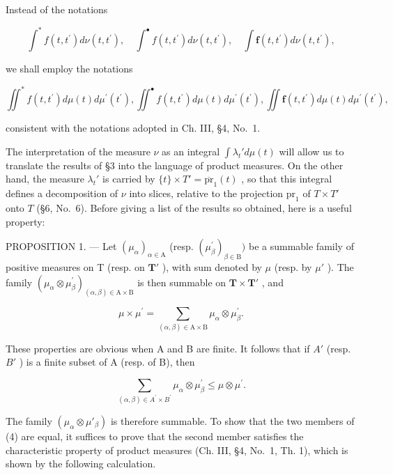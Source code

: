 Instead of the notations

\[
\int^ {*} f (t, t ^ {\prime}) d \nu (t, t ^ {\prime}), \quad \int^ {\bullet} f (t, t ^ {\prime}) d \nu (t, t ^ {\prime}), \quad \int \mathbf {f} (t, t ^ {\prime}) d \nu (t, t ^ {\prime}),
\]

we shall employ the notations

\[
\iint^ {*} f (t, t ^ {\prime}) d \mu (t) d \mu^ {\prime} (t ^ {\prime}), \iint^ {\bullet} f (t, t ^ {\prime}) d \mu (t) d \mu^ {\prime} (t ^ {\prime}), \iint \mathbf {f} (t, t ^ {\prime}) d \mu (t) d \mu^ {\prime} (t ^ {\prime}),
\]

consistent with the notations adopted in Ch. III, §4, No.~1.

The interpretation of the measure \(\nu\) as an integral \(\int \lambda_t' d\mu(t)\) will allow us to translate the results of §3 into the language of product measures. On the other hand, the measure \(\lambda_t'\) is carried by \(\{t\} \times T' = \overline{\text{pr}}_1(t)\) , so that this integral defines a decomposition of \(\nu\) into slices, relative to the projection \(\text{pr}_1\) of \(T \times T'\) onto \(T\) (§6, No.~6). Before giving a list of the results so obtained, here is a useful property:

PROPOSITION 1. --- Let \((\mu_{\alpha})_{\alpha \in \mathrm{A}}\) (resp. \((\mu_{\beta}^{\prime})_{\beta \in \mathrm{B}})\) be a summable family of positive measures on T (resp. on \(\mathbf{T}'\) ), with sum denoted by \(\mu\) (resp. by \(\mu'\) ). The family \((\mu_{\alpha} \otimes \mu_{\beta}^{\prime})_{(\alpha, \beta) \in \mathrm{A} \times \mathrm{B}}\) is then summable on \(\mathbf{T} \times \mathbf{T}'\) , and

\[
\mu \times \mu^ {\prime} = \sum_ {(\alpha , \beta) \in \mathrm{A} \times \mathrm{B}} \mu_ {\alpha} \otimes \mu_ {\beta} ^ {\prime}.\tag{4}
\]

These properties are obvious when A and B are finite. It follows that if \(A'\) (resp. \(B'\) ) is a finite subset of A (resp. of B), then

\[
\sum_ {(\alpha , \beta) \in A ^ {\prime} \times B ^ {\prime}} \mu_ {\alpha} \otimes \mu_ {\beta} ^ {\prime} \leqslant \mu \otimes \mu^ {\prime}.
\]

The family \((\mu_{\alpha} \otimes \mu'_{\beta})\) is therefore summable. To show that the two members of (4) are equal, it suffices to prove that the second member satisfies the characteristic property of product measures (Ch. III, §4, No.~1, Th. 1), which is shown by the following calculation.

